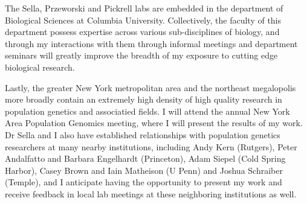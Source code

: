 \documentclass[11pt]{article}
\begin{document}
The Sella, Przeworski and  Pickrell labs are embedded in the department of Biological Sciences at Columbia University. Collectively, the faculty of this department possess expertise across various sub-disciplines of biology, and through my interactions with them through informal meetings and department seminars will greatly improve the breadth of my exposure to cutting edge biological research.

Lastly, the greater New York metropolitan area and the northeast megalopolis more broadly contain an extremely high density of high quality research in population genetics and associatied fields. I will attend the annual New York Area Population Genomics meeting, where I will present the results of my work. Dr Sella and I also have established relationships with population genetics researchers at many nearby institutions, including Andy Kern (Rutgers), Peter Andalfatto and Barbara Engelhardt (Princeton), Adam Siepel (Cold Spring Harbor), Casey Brown and Iain Matheison (U Penn) and Joshua Schraiber (Temple), and I anticipate having the opportunity to present my work and receive feedback in local lab meetings at these neighboring institutions as well.
\end{document}
